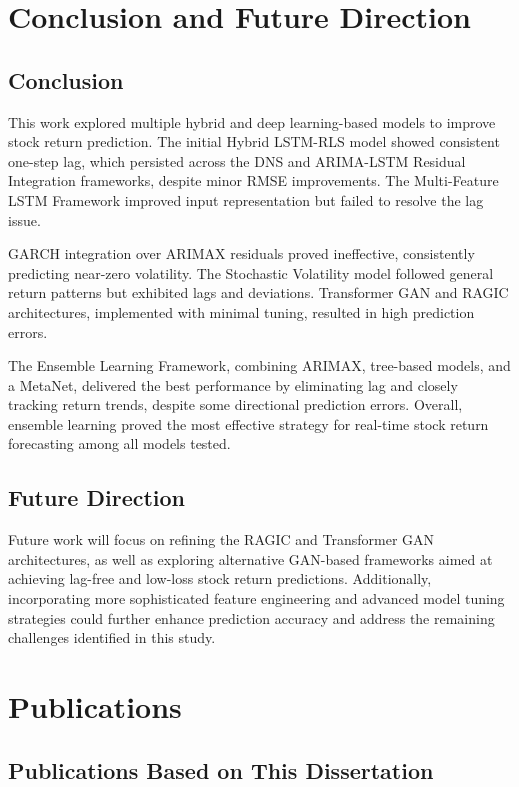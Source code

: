 \chapter{Conclusion and Future Direction}

\section{Conclusion}
This work explored multiple hybrid and deep learning-based models to improve stock return prediction. The initial Hybrid LSTM-RLS model showed consistent one-step lag, which persisted across the DNS and ARIMA-LSTM Residual Integration frameworks, despite minor RMSE improvements. The Multi-Feature LSTM Framework improved input representation but failed to resolve the lag issue.

GARCH integration over ARIMAX residuals proved ineffective, consistently predicting near-zero volatility. The Stochastic Volatility model followed general return patterns but exhibited lags and deviations. Transformer GAN and RAGIC architectures, implemented with minimal tuning, resulted in high prediction errors.

The Ensemble Learning Framework, combining ARIMAX, tree-based models, and a MetaNet, delivered the best performance by eliminating lag and closely tracking return trends, despite some directional prediction errors. Overall, ensemble learning proved the most effective strategy for real-time stock return forecasting among all models tested.

\section{Future Direction}
Future work will focus on refining the RAGIC and Transformer GAN architectures, as well as exploring alternative GAN-based frameworks aimed at achieving lag-free and low-loss stock return predictions. Additionally, incorporating more sophisticated feature engineering and advanced model tuning strategies could further enhance prediction accuracy and address the remaining challenges identified in this study.


\chapter{Publications}

\section*{Publications Based on This Dissertation}

